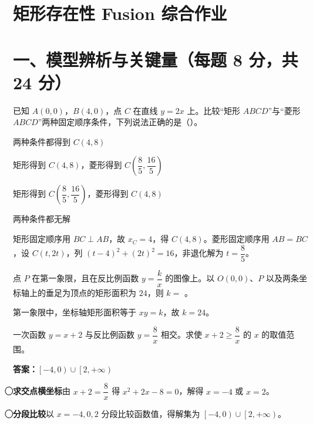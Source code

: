 \documentclass{exam-zh}
\newcommand{\answerarea}[1][40mm]{%
  \vspace{2mm}%
  \begin{tcolorbox}[
    enhanced, breakable,
    colback=white,
    colframe=white,
    boxrule=0pt,
    height=#1,
    valign=top,
    bottom=0mm,
    after skip=0mm,
  ]
  \end{tcolorbox}%
}
\newcounter{solstep}
\newcommand{\solstep}[2]{%
  \stepcounter{solstep}%
  \par\medskip
  \noindent\hangindent=6mm
  {\color{edu-blue}\bfseries\textcircled{\scriptsize\thesolstep}\enspace #1}\enspace #2\par
}
\begin{document}
\section*{矩形存在性 Fusion 综合作业}

\section*{一、模型辨析与关键量（每题 8 分，共 24 分）}


\begin{question}[points=8]
  已知 $A(0,0)$，$B(4,0)$，点 $C$ 在直线 $y=2x$ 上。比较“矩形 $ABCD$”与“菱形 $ABCD$”两种固定顺序条件，下列说法正确的是（\quad）。

  \begin{choices}
    \item 两种条件都得到 $C(4,8)$
    \item 矩形得到 $C(4,8)$，菱形得到 $C\left(\dfrac85,\dfrac{16}{5}\right)$
    \item 矩形得到 $C\left(\dfrac85,\dfrac{16}{5}\right)$，菱形得到 $C(4,8)$
    \item 两种条件都无解
  \end{choices}
  \paren[B]
  \begin{solutionblock}
    矩形固定顺序用 $BC\perp AB$，故 $x_C=4$，得 $C(4,8)$。菱形固定顺序用 $AB=BC$，设 $C(t,2t)$，列 $(t-4)^2+(2t)^2=16$，非退化解为 $t=\dfrac85$。
  \end{solutionblock}
\end{question}



\begin{question}[points=8]
  点 $P$ 在第一象限，且在反比例函数 $y=\dfrac{k}{x}$ 的图像上。以 $O(0,0)$、$P$ 以及两条坐标轴上的垂足为顶点的矩形面积为 $24$，则 $k=$ \underline{\hspace{2cm}}。

  \paren[$24$]
  \begin{solutionblock}
    第一象限中，坐标轴矩形面积等于 $xy=k$，故 $k=24$。
  \end{solutionblock}
\end{question}



\begin{problem}[points=8]
  一次函数 $y=x+2$ 与反比例函数 $y=\dfrac{8}{x}$ 相交。求使 $x+2\ge \dfrac{8}{x}$ 的 $x$ 的取值范围。

  \answerarea[28mm]
  \setcounter{solstep}{0}
  \begin{solutionblock}
    \textbf{答案：}$\left[-4,0\right)\cup\left[2,+\infty\right)$\par\medskip
    \solstep{求交点横坐标}{由 $x+2=\dfrac8x$ 得 $x^2+2x-8=0$，解得 $x=-4$ 或 $x=2$。}
    \solstep{分段比较}{以 $x=-4,0,2$ 分段比较函数值，得解集为 $\left[-4,0\right)\cup\left[2,+\infty\right)$。}
  \end{solutionblock}
\end{problem}
\end{document}
